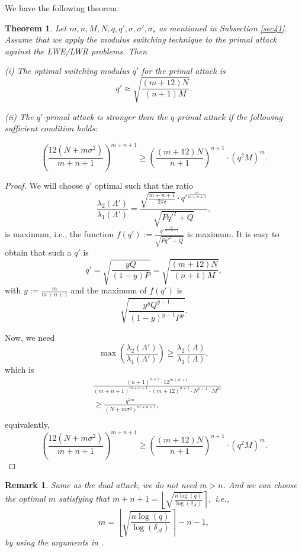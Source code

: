 \documentclass{cta-author}
\newtheorem{theorem}{Theorem}{}
\newtheorem{remark}{Remark}{}
\begin{document}
We have the following theorem:
\begin{theorem} \label{theorem5} Let $m, n, M, N, q, q', \sigma, \sigma', \sigma_s$ as mentioned in Subsection \ref{sec41}. Assume that we apply the modulus switching technique to the primal attack against the LWE/LWR problems. Then
	
	(i) The optimal switching modulus $q'$ for the primal attack is
	\begin{equation} \label{eqm}
	q'\approx \sqrt{\frac{(m+12)N}{(n+1)M}}.
	\end{equation}
	
	(ii) The $q'$-primal attack is stronger than the $q$-primal attack if the following sufficient condition holds:  
		
		
		\begin{equation}\label{keya4}
			\left(\frac{12(N+m\sigma^2)}{m+n+1}\right)^{m+n+1} \geq \left( \frac{(m+12)N}{n+1}\right)^{n+1} \cdot \left( q^{2} M \right)^{m}.
			\end{equation}	
			
\end{theorem}

\begin{proof}
We will choose $q'$ optimal such that the ratio 
$$\frac{\lambda_2(\Lambda')}{\lambda_1(\Lambda')}=\frac{\sqrt{\frac{m+n+1}{2 \pi \mathfrak{e}}}\cdot {q'}^{\frac{m}{m+n+1}}}{\sqrt{Pq'^2+Q}},$$
is maximum, i.e., the function $f(q'):=\frac{ {q'}^{\frac{m}{m+n+1}}}{\sqrt{Pq'^2+Q}}$ is maximum. It is easy to obtain that such a $q'$ is
$$q'=\sqrt{\frac{yQ}{(1-y)P}}=\sqrt{\frac{(m+12)N}{(n+1)M}},$$  with $y:=\frac{m}{m+n+1}$
and the maximum of $f(q')$ is $$\sqrt{\frac{y^y Q^{y-1}}{(1-y)^{y-1}P^{y}}}.$$


Now, we need $$\max\left(\frac{\lambda_2(\Lambda')}{\lambda_1(\Lambda')} \right)\geq \frac{\lambda_2(\Lambda)}{\lambda_1(\Lambda)},$$  which is
\begin{equation*}
\begin{split}
&\frac{(n+1)^{n+1} \cdot 12^{m+n+1}}{(m+n+1)^{m+n+1} \cdot (m+12)^{n+1}\cdot N^{n+1}\cdot M^m}\\
& \geq \frac{q^{2m}}{(N+m\sigma^2)^{m+n+1}},\\
\end{split}
\end{equation*}
equivalently,
\begin{equation*}\label{keymn}
\left(\frac{12(N+m\sigma^2)}{m+n+1}\right)^{m+n+1} \geq \left( \frac{(m+12)N}{n+1}\right)^{n+1} \cdot \left( q^{2} M \right)^{m}.
\end{equation*}
\end{proof}
\begin{remark}
Same as the dual attack, we do not need $m>n$. And we can choose the optimal $m$ satisfying that $ 
m+n+1=\left \lfloor \sqrt{\frac{n\log (q)}{ \log (\delta_{\mathcal{A}})}} \right\rceil,$
i.e., 
\begin{equation}\label{eqtt2} 
m=\left \lfloor \sqrt{\frac{n\log (q)}{\log (\delta_{\mathcal{A}})}} \right\rceil-n-1,
\end{equation}
by using the arguments in \cite[Section 4.2]{BG14}.
\end{remark}
\end{document}
